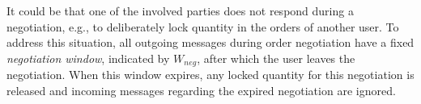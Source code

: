 
It could be that one of the involved parties does not respond during a negotiation, e.g., to deliberately lock quantity in the orders of another user.
To address this situation, all outgoing messages during order negotiation have a fixed \emph{negotiation window}, indicated by $ W_{neg} $, after which the user leaves the negotiation.
When this window expires, any locked quantity for this negotiation is released and incoming messages regarding the expired negotiation are ignored.



